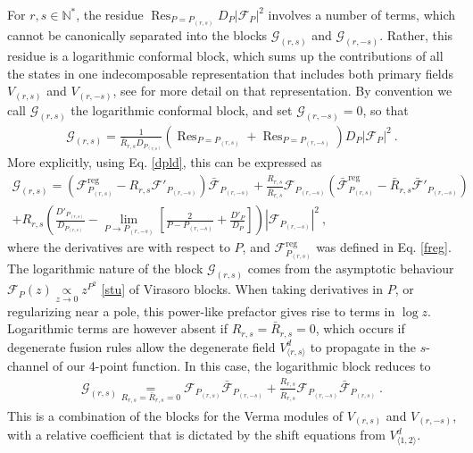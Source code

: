 \documentclass[12pt, a4paper]{article}
\theoremstyle{break}
\begin{document}
For $r,s\in\mathbb{N}^*$, the residue $\operatorname{Res}_{P=P_{(r,s)}}D_P\left|\mathcal{F}_{P}\right|^2$ 
involves a number of terms, which cannot be canonically separated into the blocks 
$\mathcal{G}_{(r,s)}$ and $\mathcal{G}_{(r,-s)}$. Rather, this residue is a logarithmic conformal block, which sums up the contributions of all the states in one indecomposable representation that includes both primary fields $V_{(r,s)}$ and $V_{(r,-s)}$, see \cite{nr20} for more detail on that representation. By convention we call $\mathcal{G}_{(r,s)}$ the logarithmic conformal block, and set $\mathcal{G}_{(r,-s)}=0$, so that 
\begin{align}
 \mathcal{G}_{(r,s)} = \frac{1}{\bar R_{r,s} D_{P_{(r,s)}}} \left( \operatorname{Res}_{P=P_{(r,s)}} + \operatorname{Res}_{P=P_{(r,-s)}}\right)D_P\left|\mathcal{F}_{P}\right|^2 \ . 
\end{align}
More explicitly, using Eq. \eqref{dpld}, this can be expressed as 
\begin{multline}
  \mathcal{G}_{(r,s)} = \left(\mathcal{F}^\text{reg}_{P_{(r,s)}} -R_{r,s} \mathcal{F}'_{P_{(r,-s)}}\right) \bar{\mathcal{F}}_{P_{(r,-s)}} 
  + \frac{R_{r,s}}{\bar{R}_{r,s}} \mathcal{F}_{P_{(r,-s)}} \left(\bar{\mathcal{F}}^\text{reg}_{P_{(r,s)}} -\bar R_{r,s} \bar{\mathcal{F}}'_{P_{(r,-s)}}\right)
  \\
  + R_{r,s} \left( \frac{D'_{P_{(r,s)}}}{D_{P_{(r,s)}}} - \lim_{P\to P_{(r,-s)}}\left[\frac{2}{P-P_{(r,-s)}} +\frac{D'_P}{D_P}\right]\right)
  \left|\mathcal{F}_{P_{(r,-s)}}\right|^2 
  \ ,
\end{multline}
where the derivatives are with respect to $P$, and
$\mathcal{F}^\text{reg}_{P_{(r,s)}}$ was defined in Eq. \eqref{freg}.
The logarithmic nature of the block $\mathcal{G}_{(r,s)}$ comes from the asymptotic behaviour $\mathcal{F}_P(z)\underset{z\to 0}{\propto} z^{P^2} $ \eqref{stu} of Virasoro blocks. When taking derivatives in $P$, or regularizing near a pole, this power-like prefactor gives rise to terms in $\log z$. Logarithmic terms are however absent if $R_{r,s}=\bar R_{r,s}=0$, which occurs if degenerate fusion rules allow the degenerate field $V^d_{\langle r,s\rangle}$ to propagate in the $s$-channel of our 4-point function. In this case, the logarithmic block reduces to 
\begin{align}
 \mathcal{G}_{(r,s)} \underset{R_{r,s}=\bar R_{r,s}=0}{=} 
 \mathcal{F}_{P_{(r,s)}}  \bar{\mathcal{F}}_{P_{(r,-s)}} + 
 \frac{R_{r,s}}{\bar{R}_{r,s}} \mathcal{F}_{P_{(r,-s)}} \bar{\mathcal{F}}_{P_{(r,s)}} \ .
\end{align}
This is a combination of the blocks for the Verma modules of $V_{(r,s)}$ and $V_{(r,-s)}$, with a relative coefficient that is dictated by the shift equations from $V^d_{\langle 1,2\rangle}$. 
\end{document}
